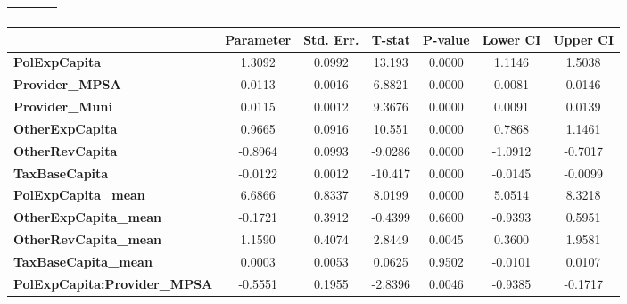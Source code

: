 \begin{center}
\begin{tabular}{lclc}
\textbf{}                                  &                    & \textbf{                     }   &                  \\
\bottomrule
\end{tabular}
\begin{tabular}{lcccccc}
                                           & \textbf{Parameter} & \textbf{Std. Err.} & \textbf{T-stat} & \textbf{P-value} & \textbf{Lower CI} & \textbf{Upper CI}  \\
\midrule
\textbf{PolExpCapita}                      &       1.3092       &       0.0992       &      13.193     &      0.0000      &       1.1146      &       1.5038       \\
\textbf{Provider\_MPSA}                    &       0.0113       &       0.0016       &      6.8821     &      0.0000      &       0.0081      &       0.0146       \\
\textbf{Provider\_Muni}                    &       0.0115       &       0.0012       &      9.3676     &      0.0000      &       0.0091      &       0.0139       \\
\textbf{OtherExpCapita}                    &       0.9665       &       0.0916       &      10.551     &      0.0000      &       0.7868      &       1.1461       \\
\textbf{OtherRevCapita}                    &      -0.8964       &       0.0993       &     -9.0286     &      0.0000      &      -1.0912      &      -0.7017       \\
\textbf{TaxBaseCapita}                     &      -0.0122       &       0.0012       &     -10.417     &      0.0000      &      -0.0145      &      -0.0099       \\
\textbf{PolExpCapita\_mean}                &       6.6866       &       0.8337       &      8.0199     &      0.0000      &       5.0514      &       8.3218       \\
\textbf{OtherExpCapita\_mean}              &      -0.1721       &       0.3912       &     -0.4399     &      0.6600      &      -0.9393      &       0.5951       \\
\textbf{OtherRevCapita\_mean}              &       1.1590       &       0.4074       &      2.8449     &      0.0045      &       0.3600      &       1.9581       \\
\textbf{TaxBaseCapita\_mean}               &       0.0003       &       0.0053       &      0.0625     &      0.9502      &      -0.0101      &       0.0107       \\
\textbf{PolExpCapita:Provider\_MPSA}       &      -0.5551       &       0.1955       &     -2.8396     &      0.0046      &      -0.9385      &      -0.1717       \\

\end{tabular}
\end{center}

